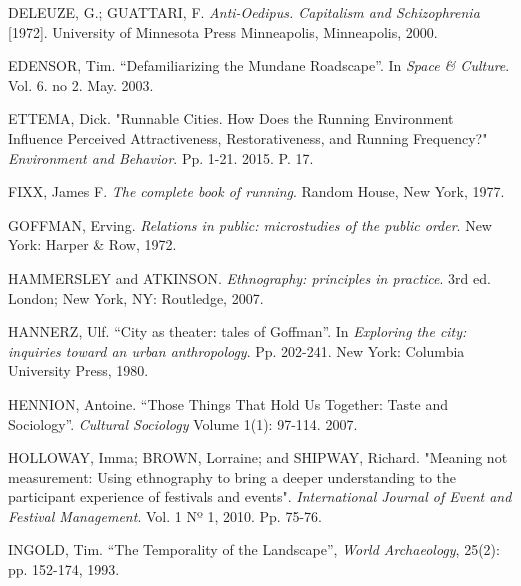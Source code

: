 \begin{thebibliography}{99\kern\bibindent}

\bibitem{} DELEUZE, G.; GUATTARI, F. 
\textit{Anti-Oedipus. Capitalism and Schizophrenia} [1972].
University of Minnesota Press Minneapolis, Minneapolis, 2000.

\bibitem{} EDENSOR, Tim. ``Defamiliarizing the Mundane Roadscape''. In \textit{Space \& Culture}. Vol. 6. no 2.
May. 2003.

\bibitem{} ETTEMA, Dick. "Runnable Cities. How Does the Running Environment Influence Perceived Attractiveness, Restorativeness, and Running Frequency?" \textit{Environment and Behavior}. Pp. 1-21. 2015. P. 17.

\bibitem{} FIXX, James F. \textit{The complete book of running}. Random House, New York, 1977.

\bibitem{} GOFFMAN, Erving. \textit{Relations in public: microstudies of the public order}. New York: Harper \& Row, 1972. 

\bibitem{} HAMMERSLEY and ATKINSON. \textit{Ethnography: principles in practice}. 3rd ed. London; New York, NY: Routledge, 2007. 

\bibitem{} HANNERZ, Ulf. ``City as theater: tales of Goffman''. In 
\textit{Exploring the city: inquiries toward an urban anthropology}. Pp. 202-241. New York: Columbia University Press, 1980. 

\bibitem{} HENNION, Antoine. ``Those Things That Hold Us Together: Taste and Sociology''. \textit{Cultural Sociology} Volume 1(1): 97-114. 2007.

\bibitem {} HOLLOWAY, Imma; BROWN, Lorraine; and SHIPWAY, Richard. "Meaning not measurement: Using ethnography to bring a deeper understanding to the participant experience of festivals and events". \textit{International Journal of Event and Festival Management}. Vol. 1 Nº 1, 2010. Pp. 75-76.

\bibitem{} INGOLD, Tim. ``The Temporality of the Landscape'', \textit{World Archaeology}, 25(2): pp. 152-174, 1993. 


\end{thebibliography}
